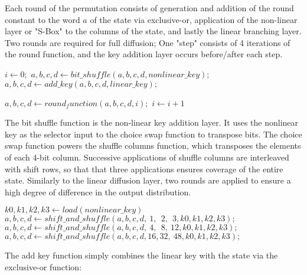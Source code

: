 \documentclass[preprint]{iacrtrans}
\begin{document}
Each round of the permutation consists of generation and addition of the round constant to the word $a$ of the state via exclusive-or, application of the non-linear layer or "S-Box" to the columns of the state, and lastly the linear branching layer. Two rounds are required for full diffusion; One "step" consists of 4 iterations of the round function, and the key addition layer occurs before/after each step. \\

\begin{algorithmic}
	\State $i \gets 0;$
		\State $a, b, c, d \gets bit\_shuffle(a, b, c, d, nonlinear\_key);$
		\State $a, b, c, d \gets add\_key(a, b, c, d, linear\_ key);$
	
			\State $a, b, c, d \gets round_function(a, b, c, d, i);$	
			\State $i \gets i + 1$
		\EndFor
	\EndFor
\EndFunction\\
\end{algorithmic}

The bit shuffle function is the non-linear key addition layer. It uses the nonlinear key as the selector input to the choice swap function to transpose bits. The choice swap function powers the shuffle columns function, which transposes the elements of each 4-bit column. Successive applications of shuffle columns are interleaved with shift rows, so that that three applications ensures coverage of the entire state. Similarly to the linear diffusion layer, two rounds are applied to ensure a high degree of difference in the output distribution.\\

\begin{algorithmic}
	\State $k0, k1, k2, k3 \gets load(nonlinear\_key)$
		\State $a, b, c, d \gets shift\_and\_shuffle(a, b, c, d, \ 1,\ \ 2,\ \ 3, k0, k1, k2, k3);$
		\State $a, b, c, d \gets shift\_and\_shuffle(a, b, c, d, \ 4,\ \ 8,\ 12, k0, k1, k2, k3);$
		\State $a, b, c, d \gets shift\_and\_shuffle(a, b, c, d, 16, 32,\ 48, k0, k1, k2, k3);$
	\EndFor
\EndFunction\\
\end{algorithmic}


The add key function simply combines the linear key with the state via the exclusive-or function:\\
\end{document}
